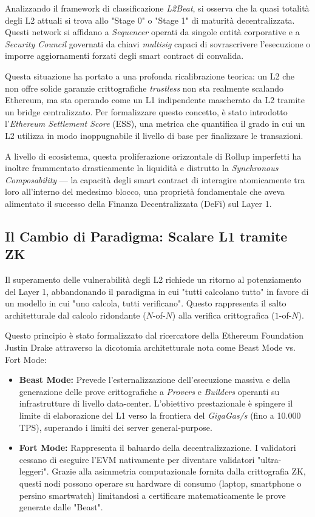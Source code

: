 \documentclass[12pt,a4paper,openright,twoside]{report}
\begin{document}
Analizzando il framework di classificazione \textit{L2Beat}\cite{l2beat}, si osserva che la quasi totalità degli L2 attuali si trova allo "Stage 0" o "Stage 1" di maturità decentralizzata. Questi network si affidano a \textit{Sequencer} operati da singole entità corporative e a \textit{Security Council} governati da chiavi \textit{multisig} capaci di sovrascrivere l'esecuzione o imporre aggiornamenti forzati degli smart contract di convalida.

Questa situazione ha portato a una profonda ricalibrazione teorica: un L2 che non offre solide garanzie crittografiche \textit{trustless} non sta realmente scalando Ethereum, ma sta operando come un L1 indipendente mascherato da L2 tramite un bridge centralizzato. Per formalizzare questo concetto, è stato introdotto l'\textit{Ethereum Settlement Score} (ESS), una metrica che quantifica il grado in cui un L2 utilizza in modo inoppugnabile il livello di base per finalizzare le transazioni.

A livello di ecosistema, questa proliferazione orizzontale di Rollup imperfetti ha inoltre frammentato drasticamente la liquidità e distrutto la \textit{Synchronous Composability} — la capacità degli smart contract di interagire atomicamente tra loro all'interno del medesimo blocco, una proprietà fondamentale che aveva alimentato il successo della Finanza Decentralizzata (DeFi) sul Layer 1.

\subsection{Il Cambio di Paradigma: Scalare L1 tramite ZK}

Il superamento delle vulnerabilità degli L2 richiede un ritorno al potenziamento del Layer 1, abbandonando il paradigma in cui "tutti calcolano tutto" in favore di un modello in cui "uno calcola, tutti verificano". Questo rappresenta il salto architetturale dal calcolo ridondante ($N$-of-$N$) alla verifica crittografica ($1$-of-$N$).

Questo principio è stato formalizzato dal ricercatore della Ethereum Foundation Justin Drake \cite{lean_ethereum} attraverso la dicotomia architetturale nota come Beast Mode vs. Fort Mode:
\begin{itemize}
  \item \textbf{Beast Mode:} Prevede l'esternalizzazione dell'esecuzione massiva e della generazione delle prove crittografiche a \textit{Provers} e \textit{Builders} operanti su infrastrutture di livello data-center. L'obiettivo prestazionale è spingere il limite di elaborazione del L1 verso la frontiera del \textit{GigaGas/s} (fino a 10.000 TPS), superando i limiti dei server general-purpose.
  \item \textbf{Fort Mode:} Rappresenta il baluardo della decentralizzazione. I validatori cessano di eseguire l'EVM nativamente per diventare validatori "ultra-leggeri". Grazie alla asimmetria computazionale fornita dalla crittografia ZK, questi nodi possono operare su hardware di consumo (laptop, smartphone o persino smartwatch) limitandosi a certificare matematicamente le prove generate dalle "Beast".
\end{itemize}
\end{document}
